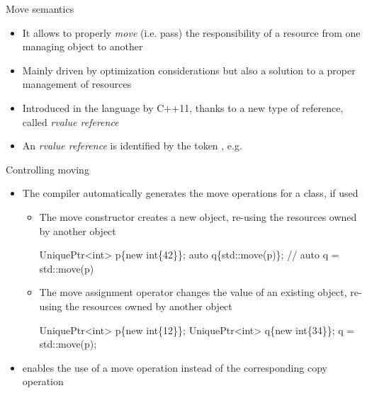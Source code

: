 \begin{frame}{Move semantics}

  \begin{itemize}
  \item It allows to properly \textit{move} (i.e. pass) the responsibility of a
    resource from one managing object to another
  \item Mainly driven by optimization considerations but also a solution to
    a proper management of resources
  \item Introduced in the language by C++11, thanks to a new type of reference,
    called \textit{rvalue reference}
  \item An \textit{rvalue reference} is identified by the token \code{\&\&}, e.g.
  \end{itemize}

\end{frame}

\begin{frame}[fragile]{Controlling moving}
  \begin{itemize}
  \item<1-> The compiler automatically generates the move operations for a class, if
    used
    \begin{itemize}
    \item The move constructor creates a \alert{new} object, \alert{re-using} the
      resources owned by another object

      \begin{codeblock}
UniquePtr<int> p\{new int\{42\}\};
auto q\{std::move(p)\}; // auto q = std::move(p)\end{codeblock}

     \item The move assignment operator changes the value of an \alert{existing}
       object, \alert{re-using} the resources owned by another object

      \begin{codeblock}
UniquePtr<int> p\{new int\{12\}\};
UniquePtr<int> q\{new int\{34\}\};
q = std::move(p);\end{codeblock}

     \end{itemize}
   \item<2->  enables the use of a move operation instead of the
     corresponding copy operation
  \end{itemize}
\end{frame}

